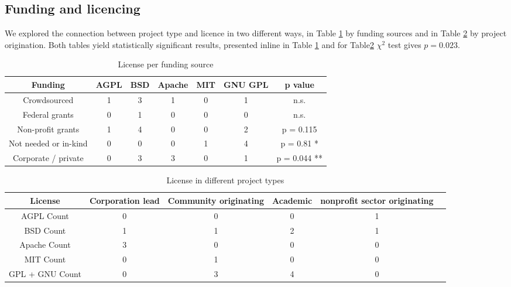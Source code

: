 \subsection{Funding and licencing}

We explored the connection between project type and licence in two different ways, in Table \ref{tab:licence_per_fudning} by funding sources and in Table \ref{tab:licence_per_project_type} by project origination. Both tables yield statistically significant results, presented inline in Table \ref{tab:licence_per_fudning} and for Table\ref{tab:licence_per_project_type} $\chi^2$ test gives $p=0.023$.

\begin{table}[htbp]
  \centering
  \caption{License per funding source}
    \begin{tabular}{|c|c|c|c|c|c|c|}
    \hline
         Funding & AGPL  & BSD   & Apache & MIT   & GNU GPL & p value \\
\hline
    Crowdsourced & 1     & 3     & 1     & 0     & 1     & n.s. \\
    Federal grants & 0     & 1     & 0     & 0     & 0     & n.s. \\
    Non-profit grants & 1     & 4     & 0     & 0     & 2     & p = 0.115 \\
    Not needed or in-kind & 0     & 0     & 0     & 1     & 4     & p = 0.81 * \\
    Corporate / private & 0     & 3     & 3     & 0     & 1     & p = 0.044 ** \\
\hline    
    \end{tabular}
  \label{tab:licence_per_fudning}
\end{table}

\begin{table}[htbp]
  \centering
  \caption{License in different project types}
    \begin{tabular}{|c|c|c|c|c|c|}
	\hline
          License & Corporation lead & Community originating & Academic & nonprofit sector originating \\
    \hline
    AGPL Count & 0     & 0     & 0     & 1 \\
    BSD  Count & 1     & 1     & 2     & 1 \\
    Apache Count & 3     & 0     & 0     & 0 \\
    MIT  Count & 0     & 1     & 0     & 0 \\
    GPL + GNU Count & 0     & 3     & 4     & 0 \\
    \hline
    \end{tabular}
  \label{tab:licence_per_project_type}
\end{table}%